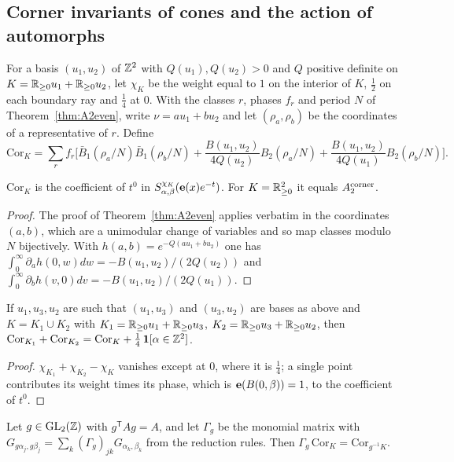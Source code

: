 \subsection{Corner invariants of cones and the action of automorphs}\label{sec:cones}
For a basis $(u_1,u_2)$ of $\mathbb{Z}^2$ with $Q(u_1),Q(u_2)>0$ and $Q$ positive definite on $K=\mathbb{R}_{\ge0}u_1+\mathbb{R}_{\ge0}u_2$, let $\chi_K$ be the weight equal to $1$ on the interior of $K$,
$\frac12$ on each boundary ray and $\frac14$ at $0$. With the classes $r$, phases $f_r$ and period $N$ of Theorem~\ref{thm:A2even}, write $\nu=au_1+bu_2$ and let $(\rho_a,\rho_b)$
be the coordinates of a representative of $r$. Define
\[ \mathrm{Cor}_K=\sum_rf_r\Big[\bar B_1(\rho_a/N)\bar B_1(\rho_b/N)+\frac{B(u_1,u_2)}{4Q(u_2)}B_2(\rho_a/N)+\frac{B(u_1,u_2)}{4Q(u_1)}B_2(\rho_b/N)\Big]. \]
\begin{proposition}\label{prop:cor}
$\mathrm{Cor}_K$ is the coefficient of $t^0$ in $S^{\chi_K}_{\alpha,\beta}(\mathbf{e}(x)e^{-t})$. For $K=\mathbb{R}_{\ge0}^2$ it equals $A_2^{\rm corner}$.
\end{proposition}
\begin{proof}
The proof of Theorem~\ref{thm:A2even} applies verbatim in the coordinates $(a,b)$, which are a unimodular change of variables and so map classes modulo $N$ bijectively.
With $h(a,b)=e^{-Q(au_1+bu_2)}$ one has $\int_0^\infty\partial_ah(0,w)dw=-B(u_1,u_2)/(2Q(u_2))$ and $\int_0^\infty\partial_bh(v,0)dv=-B(u_1,u_2)/(2Q(u_1))$.
\end{proof}
\begin{proposition}\label{prop:subdiv}
If $u_1,u_3,u_2$ are such that $(u_1,u_3)$ and $(u_3,u_2)$ are bases as above and $K=K_1\cup K_2$ with $K_1=\mathbb{R}_{\ge0}u_1+\mathbb{R}_{\ge0}u_3$, $K_2=\mathbb{R}_{\ge0}u_3+\mathbb{R}_{\ge0}u_2$, then
$\mathrm{Cor}_{K_1}+\mathrm{Cor}_{K_2}=\mathrm{Cor}_K+\frac14\,\mathbf 1[\alpha\in\mathbb{Z}^2]$.
\end{proposition}
\begin{proof}
$\chi_{K_1}+\chi_{K_2}-\chi_K$ vanishes except at $0$, where it is $\frac14$; a single point contributes its weight times its phase, which is $\mathbf{e}(B(0,\beta))=1$, to the coefficient of $t^0$.
\end{proof}
\begin{proposition}\label{prop:transport}
Let $g\in\mathrm{GL}_2(\mathbb{Z})$ with $g^{\mathsf T}Ag=A$, and let $\Gamma_g$ be the monomial matrix with $G_{g\alpha_j,g\beta_j}=\sum_k(\Gamma_g)_{jk}G_{\alpha_k,\beta_k}$ from the reduction rules. Then
$\Gamma_g\,\mathrm{Cor}_K=\mathrm{Cor}_{g^{-1}K}$.
\end{proposition}
